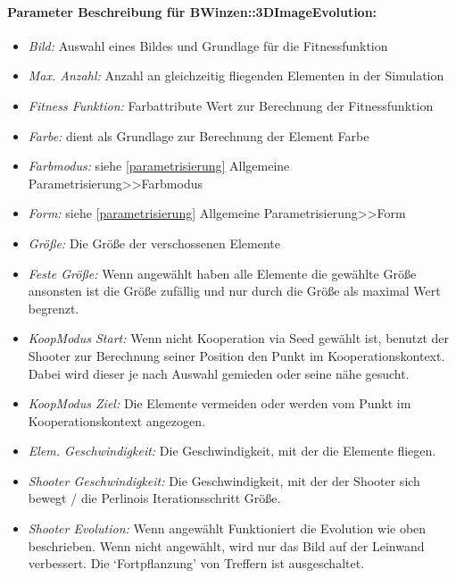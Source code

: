 \documentclass[../mciAusarbeitung.tex]{subfiles}
\begin{document}
	\paragraph{Parameter Beschreibung für BWinzen::3DImageEvolution:}
	\begin{itemize}
	\setlength\itemsep{-0.1em}
		\item\textit{Bild:} Auswahl eines Bildes und Grundlage für die Fitnessfunktion
		\item\textit{Max. Anzahl:} Anzahl an gleichzeitig fliegenden Elementen in der Simulation
		\item\textit{Fitness Funktion:} Farbattribute Wert zur Berechnung der Fitnessfunktion 
		\item\textit{Farbe:} dient als Grundlage zur Berechnung der Element Farbe 
		\item\textit{Farbmodus:} siehe \ref{parametrisierung} Allgemeine Parametrisierung>>Farbmodus
		\item\textit{Form:}  siehe \ref{parametrisierung} Allgemeine Parametrisierung>>Form
		\item\textit{Größe:} Die Größe der verschossenen Elemente
		\item\textit{Feste Größe:} Wenn angewählt haben alle Elemente die gewählte Größe ansonsten ist die Größe zufällig und nur durch die Größe als maximal Wert begrenzt.
		\item\textit{KoopModus Start:} Wenn nicht Kooperation via Seed gewählt ist, benutzt der Shooter zur Berechnung seiner Position den Punkt im Kooperationskontext. Dabei wird dieser je nach Auswahl gemieden oder seine nähe gesucht.
		\item\textit{KoopModus Ziel:} Die Elemente vermeiden oder werden vom Punkt im Kooperationskontext angezogen.
		\item\textit{Elem. Geschwindigkeit:} Die Geschwindigkeit, mit der die Elemente fliegen.
		\item\textit{Shooter Geschwindigkeit:} Die Geschwindigkeit, mit der der Shooter sich bewegt / die Perlinois Iterationsschritt Größe.
		\item\textit{Shooter Evolution:} Wenn angewählt Funktioniert die Evolution wie oben beschrieben. Wenn nicht angewählt, wird nur das Bild auf der Leinwand verbessert. Die `Fortpflanzung' von Treffern ist ausgeschaltet.
	\end{itemize}
\end{document}
